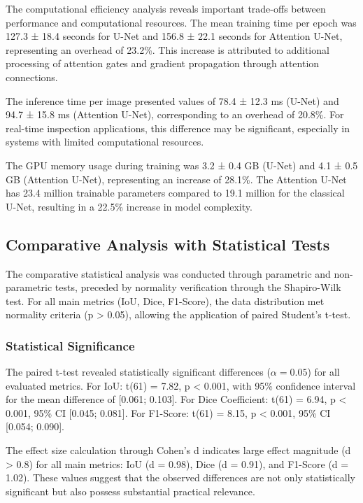 \documentclass[12pt,a4paper,twoside]{article}
\begin{document}
The computational efficiency analysis reveals important trade-offs between performance and computational resources. The mean training time per epoch was 127.3 ± 18.4 seconds for U-Net and 156.8 ± 22.1 seconds for Attention U-Net, representing an overhead of 23.2\%. This increase is attributed to additional processing of attention gates and gradient propagation through attention connections.

The inference time per image presented values of 78.4 ± 12.3 ms (U-Net) and 94.7 ± 15.8 ms (Attention U-Net), corresponding to an overhead of 20.8\%. For real-time inspection applications, this difference may be significant, especially in systems with limited computational resources.

The GPU memory usage during training was 3.2 ± 0.4 GB (U-Net) and 4.1 ± 0.5 GB (Attention U-Net), representing an increase of 28.1\%. The Attention U-Net has 23.4 million trainable parameters compared to 19.1 million for the classical U-Net, resulting in a 22.5\% increase in model complexity.

\subsection{Comparative Analysis with Statistical Tests}
\label{subsec:comparative_analysis}

The comparative statistical analysis was conducted through parametric and non-parametric tests, preceded by normality verification through the Shapiro-Wilk test. For all main metrics (IoU, Dice, F1-Score), the data distribution met normality criteria (p > 0.05), allowing the application of paired Student's t-test.

\subsubsection{Statistical Significance}

The paired t-test revealed statistically significant differences ($\alpha = 0.05$) for all evaluated metrics. For IoU: t(61) = 7.82, p < 0.001, with 95\% confidence interval for the mean difference of [0.061; 0.103]. For Dice Coefficient: t(61) = 6.94, p < 0.001, 95\% CI [0.045; 0.081]. For F1-Score: t(61) = 8.15, p < 0.001, 95\% CI [0.054; 0.090].

The effect size calculation through Cohen's d indicates large effect magnitude (d > 0.8) for all main metrics: IoU (d = 0.98), Dice (d = 0.91), and F1-Score (d = 1.02). These values suggest that the observed differences are not only statistically significant but also possess substantial practical relevance.
\end{document}
